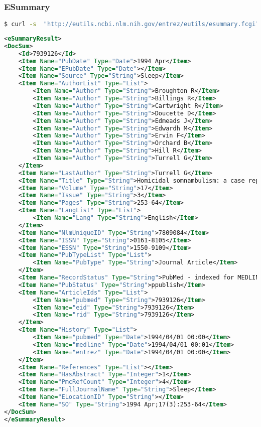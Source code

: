 \documentclass{beamer}
\begin{document}
\begin{frame}[fragile]
\frametitle{ESummary}
\begin{lstlisting}[language=bash,basicstyle=\tiny,breaklines=true]
$ curl -s  "http://eutils.ncbi.nlm.nih.gov/entrez/eutils/esummary.fcgi?db=pubmed&id=7939126"
\end{lstlisting}

\begin{lstlisting}[language=xml,basicstyle=\tiny,breaklines=false]
<eSummaryResult>
<DocSum>
	<Id>7939126</Id>
	<Item Name="PubDate" Type="Date">1994 Apr</Item>
	<Item Name="EPubDate" Type="Date"></Item>
	<Item Name="Source" Type="String">Sleep</Item>
	<Item Name="AuthorList" Type="List">
		<Item Name="Author" Type="String">Broughton R</Item>
		<Item Name="Author" Type="String">Billings R</Item>
		<Item Name="Author" Type="String">Cartwright R</Item>
		<Item Name="Author" Type="String">Doucette D</Item>
		<Item Name="Author" Type="String">Edmeads J</Item>
		<Item Name="Author" Type="String">Edwardh M</Item>
		<Item Name="Author" Type="String">Ervin F</Item>
		<Item Name="Author" Type="String">Orchard B</Item>
		<Item Name="Author" Type="String">Hill R</Item>
		<Item Name="Author" Type="String">Turrell G</Item>
	</Item>
	<Item Name="LastAuthor" Type="String">Turrell G</Item>
	<Item Name="Title" Type="String">Homicidal somnambulism: a case report.</Item>
	<Item Name="Volume" Type="String">17</Item>
	<Item Name="Issue" Type="String">3</Item>
	<Item Name="Pages" Type="String">253-64</Item>
	<Item Name="LangList" Type="List">
		<Item Name="Lang" Type="String">English</Item>
	</Item>
	<Item Name="NlmUniqueID" Type="String">7809084</Item>
	<Item Name="ISSN" Type="String">0161-8105</Item>
	<Item Name="ESSN" Type="String">1550-9109</Item>
	<Item Name="PubTypeList" Type="List">
		<Item Name="PubType" Type="String">Journal Article</Item>
	</Item>
	<Item Name="RecordStatus" Type="String">PubMed - indexed for MEDLINE</Item>
	<Item Name="PubStatus" Type="String">ppublish</Item>
	<Item Name="ArticleIds" Type="List">
		<Item Name="pubmed" Type="String">7939126</Item>
		<Item Name="eid" Type="String">7939126</Item>
		<Item Name="rid" Type="String">7939126</Item>
	</Item>
	<Item Name="History" Type="List">
		<Item Name="pubmed" Type="Date">1994/04/01 00:00</Item>
		<Item Name="medline" Type="Date">1994/04/01 00:01</Item>
		<Item Name="entrez" Type="Date">1994/04/01 00:00</Item>
	</Item>
	<Item Name="References" Type="List"></Item>
	<Item Name="HasAbstract" Type="Integer">1</Item>
	<Item Name="PmcRefCount" Type="Integer">4</Item>
	<Item Name="FullJournalName" Type="String">Sleep</Item>
	<Item Name="ELocationID" Type="String"></Item>
	<Item Name="SO" Type="String">1994 Apr;17(3):253-64</Item>
</DocSum>
</eSummaryResult>
\end{lstlisting}
\end{frame}
\end{document}
